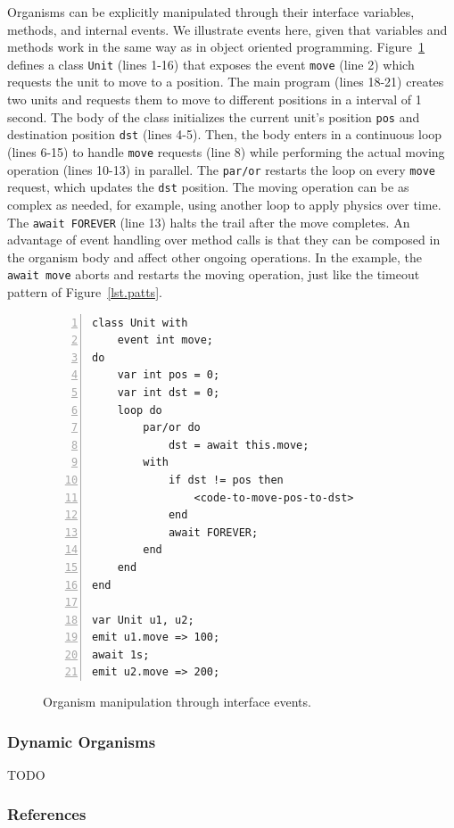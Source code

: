 \documentclass{acm_proc_article-sp}
\newcommand{\code}[1] {{\small{\texttt{#1}}}}
\newcommand{\1}{\;}
\newcommand{\2}{\;\;}
\newcommand{\3}{\;\;\;}
\newcommand{\5}{\;\;\;\;\;}
\begin{document}
Organisms can be explicitly manipulated through their interface variables, 
methods, and internal events.
%
We illustrate events here, given that variables and methods work in the same 
way as in object oriented programming.
%
Figure~\ref{lst.unit} defines a class \code{Unit} (lines 1-16) that exposes the 
event \code{move} (line 2) which requests the unit to move to a position.
%
The main program (lines 18-21) creates two units and requests them to move to 
different positions in a interval of 1 second.
%
The body of the class initializes the current unit's position \code{pos} and 
destination position \code{dst} (lines 4-5).
Then, the body enters in a continuous loop (lines 6-15) to handle \code{move} 
requests (line 8) while performing the actual moving operation (lines 10-13) in 
parallel.
The \code{par/or} restarts the loop on every \code{move} request, which updates 
the \code{dst} position.
%
The moving operation can be as complex as needed, for example, using another 
loop to apply physics over time.
The \code{await FOREVER} (line 13) halts the trail after the move completes.
%
An advantage of event handling over method calls is that they can be composed 
in the organism body and affect other ongoing operations.
In the example, the \code{await move} aborts and restarts the moving operation, 
just like the timeout pattern of Figure~\ref{lst.patts}.

\begin{figure}[t]
\begin{lstlisting}[numbers=left,xleftmargin=3em]
class Unit with
    event int move;
do
    var int pos = 0;
    var int dst = 0;
    loop do
        par/or do
            dst = await this.move;
        with
            if dst != pos then
                <code-to-move-pos-to-dst>
            end
            await FOREVER;
        end
    end
end

var Unit u1, u2;
emit u1.move => 100;
await 1s;
emit u2.move => 200;
\end{lstlisting}
\caption{ Organism manipulation through interface events.
\label{lst.unit}
}
\end{figure}

\subsubsection{Dynamic Organisms}

TODO

\subsubsection{References}
\end{document}
